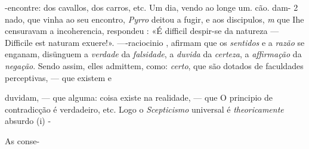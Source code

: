 -encontre: dos cavallos, dos carros, etc. Um dia, vendo ao longe um. cão. dam- 2 nado, que vinha ao seu encontro, \emph{Pyrro} deitou a fugir, e aos discipulos, \emph{m} que Ihe censuravam a incoherencia, respondeu : «É difficil despir-se da natureza --- Difficile est naturam exuere!». ----raciocinio  , afirmam que os \emph{sentidos} e a \emph{razão} se enganam, disünguem a \emph{verdade} da \emph{falsidade}, a \emph{duvida} da \emph{certeza}, a \emph{affirmação} da \emph{negação}. Sendo assim, elles admittem, como: \emph{certo}, que são dotados de faculdades perceptivas, --- que existem e

duvidam, --- que alguma: coisa existe na realidade, --- que O principio de contradicção é verdadeiro, etc. Logo o \emph{Scepticismo} universal é \emph{theoricamente} absurdo (i) -


 
As conse-

